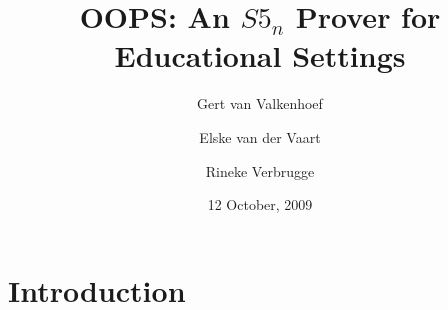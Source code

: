 \documentclass{beamer}
\title{OOPS: An $S5_n$ Prover for Educational Settings}
\author{Gert van Valkenhoef \and Elske van der Vaart \and Rineke Verbrugge}
\date{12 October, 2009}
\begin{document}
\begin{frame}
\maketitle
\end{frame}

\section{Introduction}
\subsection{}

\begin{frame}

\end{frame}
\end{document}
